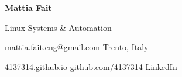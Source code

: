 {\fontsize{27}{30}\selectfont\bfseries Mattia Fait}\par
{\large\color{accent}Linux Systems \& Automation}\par
\vspace{3pt}
{\small
\href{mailto:mattia.fait.eng@gmail.com}{mattia.fait.eng@gmail.com}
\enspace\textbar\enspace Trento, Italy\par
\href{https://4137314.github.io}{4137314.github.io}
\enspace\textbar\enspace \href{https://github.com/4137314}{github.com/4137314}
\enspace\textbar\enspace \href{https://www.linkedin.com/in/mattia-f-402062447}{LinkedIn}
}\par

